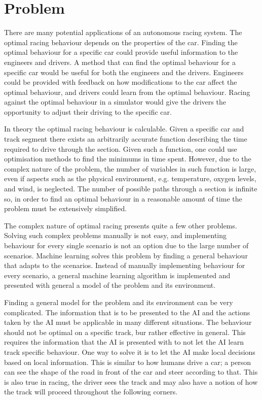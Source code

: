 \section{Problem}
There are many potential applications of an autonomous racing system. The optimal racing behaviour depends on the properties of the car. Finding the optimal behaviour for a specific car could provide useful information to the engineers and drivers. A method that can find the optimal behaviour for a specific car would be useful for both the engineers and the drivers. Engineers could be provided with feedback on how modifications to the car affect the optimal behaviour, and drivers could learn from the optimal behaviour. Racing against the optimal behaviour in a simulator would give the drivers the opportunity to adjust their driving to the specific car.

In theory the optimal racing behaviour is calculable. Given a specific car and track segment there exists an arbitrarily accurate function describing the time required to drive through the section. Given such a function, one could use optimisation methods to find the minimums in time spent. However, due to the complex nature of the problem, the number of variables in such function is large, even if aspects such as the physical environment, e.g. temperature, oxygen levels, and wind, is neglected. The number of possible paths through a section is infinite so, in order to find an optimal behaviour in a reasonable amount of time the problem must be extensively simplified.

The complex nature of optimal racing presents quite a few other problems. Solving such complex problems manually is not easy, and implementing behaviour for every single scenario is not an option due to the large number of scenarios. Machine learning solves this problem by finding a general behaviour that adapts to the scenarios. Instead of manually implementing behaviour for every scenario, a general machine learning algorithm is implemented and presented with general a model of the problem and its environment.

Finding a general model for the problem and its environment can be very complicated. The information that is to be presented to the AI and the actions taken by the AI must be applicable in many different situations. The behaviour should not be optimal on a specific track, bur rather effective in general. This requires the information that the AI is presented with to not let the AI learn track specific behaviour. One way to solve it is to let the AI make local decisions based on local information. This is similar to how humans drive a car; a person can see the shape of the road in front of the car and steer according to that. This is also true in racing, the driver sees the track and may also have a notion of how the track will proceed throughout the following corners.

